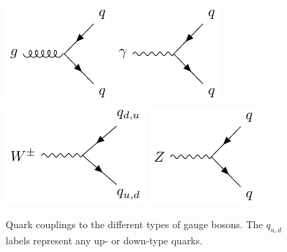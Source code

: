 \begin{centering}
\begin{figure}[!hbt]
\myfloatalign
\includegraphics[width=.45\linewidth]{feynman/quark_strong.pdf}
\includegraphics[width=.45\linewidth]{feynman/quark_em.pdf}
\includegraphics[width=.45\linewidth]{feynman/quark_w.pdf}
\includegraphics[width=.45\linewidth]{feynman/quark_z.pdf}
\caption{Quark couplings to the different types of gauge bosons. The $q_{u,d}$ labels represent any up- or down-type quarks.}
\label{fig:feynman_quarks}
\end{figure}
\end{centering}

